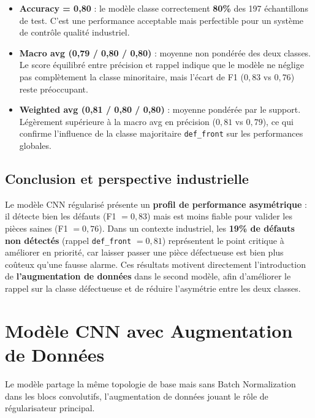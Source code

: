 \begin{itemize}
    \item \textbf{Accuracy = 0,80} : le modèle classe correctement \textbf{80\%} 
    des 197 échantillons de test. C'est une performance acceptable mais 
    perfectible pour un système de contrôle qualité industriel.

    \item \textbf{Macro avg (0,79 / 0,80 / 0,80)} : moyenne non pondérée des 
    deux classes. Le score équilibré entre précision et rappel indique que le 
    modèle ne néglige pas complètement la classe minoritaire, mais l'écart de 
    F1 ($0{,}83$ vs $0{,}76$) reste préoccupant.

    \item \textbf{Weighted avg (0,81 / 0,80 / 0,80)} : moyenne pondérée par 
    le support. Légèrement supérieure à la macro avg en précision ($0{,}81$ 
    vs $0{,}79$), ce qui confirme l'influence de la classe majoritaire 
    \texttt{def\_front} sur les performances globales.
\end{itemize}

\subsection*{Conclusion et perspective industrielle}

\begin{tcolorbox}[colback=orange!5, colframe=orange!80!black]
Le modèle CNN régularisé présente un \textbf{profil de performance asymétrique} : 
il détecte bien les défauts (F1 $= 0{,}83$) mais est moins fiable pour valider 
les pièces saines (F1 $= 0{,}76$). Dans un contexte industriel, les 
\textbf{19\% de défauts non détectés} (rappel \texttt{def\_front} $= 0{,}81$) 
représentent le point critique à améliorer en priorité, car laisser passer 
une pièce défectueuse est bien plus coûteux qu'une fausse alarme. Ces résultats 
motivent directement l'introduction de \textbf{l'augmentation de données} dans 
le second modèle, afin d'améliorer le rappel sur la classe défectueuse et de 
réduire l'asymétrie entre les deux classes.
\end{tcolorbox}

\newpage
\section{Modèle CNN avec Augmentation de Données}

Le modèle  partage la même topologie de base mais sans
Batch Normalization dans les blocs convolutifs, l'augmentation de données
jouant le rôle de régularisateur principal.




